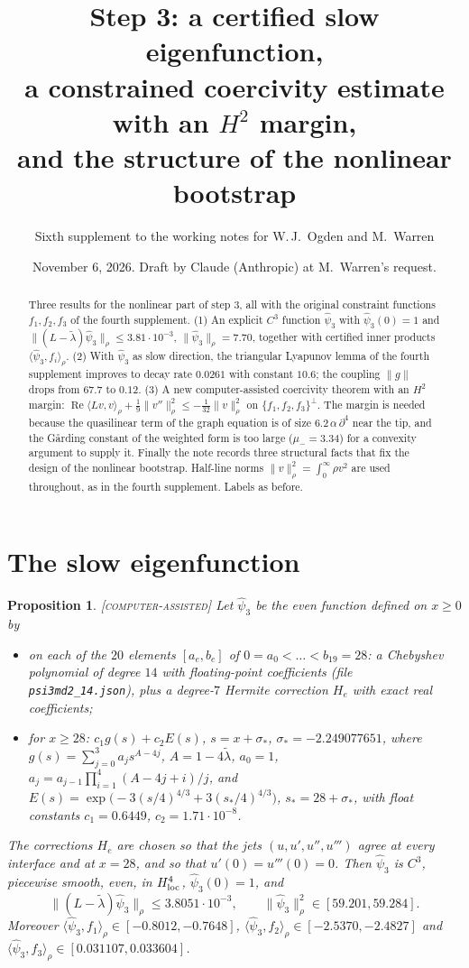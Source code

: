 \documentclass[11pt]{amsart}
\title[Step 3: slow mode and an $H^2$ margin]{Step 3: a certified slow eigenfunction,\\ a constrained coercivity estimate with an $H^2$ margin,\\ and the structure of the nonlinear bootstrap}
\author[Sixth supplement]{Sixth supplement to the working notes for W.\,J.~Ogden and M.~Warren}
\date{November 6, 2026. Draft by Claude (Anthropic) at M.~Warren's request.}
\newtheorem{proposition}[theorem]{Proposition}
\theoremstyle{remark}
\newcommand{\ip}[2]{\langle #1,#2\rangle}
\newcommand{\lab}[1]{\textup{\textsc{[#1]}}}
\providecommand{\re}{}\renewcommand{\re}{\operatorname{Re}}
\begin{document}
\begin{abstract}
Three results for the nonlinear part of step 3, all with the original constraint functions $f_1,f_2,f_3$ of the fourth supplement. (1) An explicit $C^3$ function $\hat\psi_3$ with $\hat\psi_3(0)=1$ and $\|(L-\tilde\lambda)\hat\psi_3\|_\rho\le3.81\cdot10^{-3}$, $\|\hat\psi_3\|_\rho=7.70$, together with certified inner products $\ip{\hat\psi_3}{f_i}_\rho$. (2) With $\hat\psi_3$ as slow direction, the triangular Lyapunov lemma of the fourth supplement improves to decay rate $0.0261$ with constant $10.6$; the coupling $\|g\|$ drops from $67.7$ to $0.12$. (3) A new computer-assisted coercivity theorem with an $H^2$ margin: $\re\ip{Lv}{v}_\rho+\frac19\|v''\|_\rho^2\le-\frac1{32}\|v\|_\rho^2$ on $\{f_1,f_2,f_3\}^\perp$. The margin is needed because the quasilinear term of the graph equation is of size $6.2\,\alpha\,\partial^4$ near the tip, and the Gårding constant of the weighted form is too large ($\mu_-=3.34$) for a convexity argument to supply it. Finally the note records three structural facts that fix the design of the nonlinear bootstrap. Half-line norms $\|v\|_\rho^2=\int_0^\infty\rho v^2$ are used throughout, as in the fourth supplement. Labels as before.
\end{abstract}
\maketitle

\section{The slow eigenfunction}\label{sec:psi}

\begin{proposition}\label{prop:psi}\lab{computer-assisted}
Let $\hat\psi_3$ be the even function defined on $x\ge0$ by
\begin{itemize}
\item on each of the $20$ elements $[a_e,b_e]$ of $0=a_0<\dots<b_{19}=28$: a Chebyshev polynomial of degree $14$ with floating-point coefficients (file \texttt{psi3md2\_14.json}), plus a degree-$7$ Hermite correction $H_e$ with exact real coefficients;
\item for $x\ge28$: $c_1g(s)+c_2E(s)$, $s=x+\sigma_*$, $\sigma_*=-2.249077651$, where $g(s)=\sum_{j=0}^3a_js^{A-4j}$, $A=1-4\tilde\lambda$, $a_0=1$, $a_j=a_{j-1}\prod_{i=1}^4(A-4j+i)/j$, and $E(s)=\exp\big(-3(s/4)^{4/3}+3(s_*/4)^{4/3}\big)$, $s_*=28+\sigma_*$, with float constants $c_1=0.6449$, $c_2=1.71\cdot10^{-8}$.
\end{itemize}
The corrections $H_e$ are chosen so that the jets $(u,u',u'',u''')$ agree at every interface and at $x=28$, and so that $u'(0)=u'''(0)=0$. Then $\hat\psi_3$ is $C^3$, piecewise smooth, even, in $H^4_{\rm loc}$, $\hat\psi_3(0)=1$, and
\[
\|(L-\tilde\lambda)\hat\psi_3\|_\rho\le3.8051\cdot10^{-3},\qquad \|\hat\psi_3\|_\rho^2\in[59.201,59.284].
\]
Moreover $\ip{\hat\psi_3}{f_1}_\rho\in[-0.8012,-0.7648]$, $\ip{\hat\psi_3}{f_2}_\rho\in[-2.5370,-2.4827]$ and $\ip{\hat\psi_3}{f_3}_\rho\in[0.031107,0.033604]$.
\end{proposition}
\end{document}
